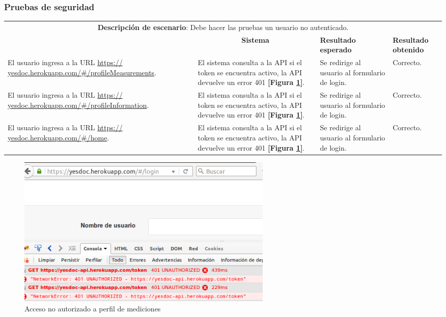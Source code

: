 \subsubsection{Pruebas de seguridad }
\begin{center}
	\begin{longtable}{|m{4cm}|m{4cm}|m{3cm}|m{2cm}|}
		\hline \hline \rowcolor[gray]{0.9}
		\multicolumn{4}{|c|}{\textbf{Procedimiento de pruebas}} \\
		\hline 
		
		\multicolumn{4}{|c|}{\textbf{Descripción de escenario}: Debe hacer las pruebas un usuario no autenticado.} \\
		\hline 
		
		\rowcolor[gray]{0.9}
		\multicolumn{1}{|c|}{\textbf{Actor}} &
		\multicolumn{1}{c|}{\textbf{Sistema}} &
		\textbf{Resultado esperado}&
		\textbf{Resultado obtenido} \\
		\hline
		El usuario ingresa a la URL \url{https:// yesdoc.herokuapp.com/#/profileMeasurements}.
		&
		El sistema consulta a la API si el token se encuentra activo, la API devuelve un error 401 \textbf{[Figura \ref{no_autorizado_profile_measurement}]}.
		&
		Se redirige al usuario al formulario de login.
		&
		Correcto.
		\\ 
		\hline
		El usuario ingresa a la URL \url{https:// yesdoc.herokuapp.com/#/profileInformation}.
		&
		El sistema consulta a la API si el token se encuentra activo, la API devuelve un error 401 \textbf{[Figura \ref{no_autorizado_profile_measurement}]}.
		&
		Se redirige al usuario al formulario de login.
		&
		Correcto.
		\\ 
		\hline
		El usuario ingresa a la URL \url{https:// yesdoc.herokuapp.com/#/home}.
		&
		El sistema consulta a la API si el token se encuentra activo, la API devuelve un error 401 \textbf{[Figura \ref{no_autorizado_profile_measurement}]}.
		&
		Se redirige al usuario al formulario de login.
		&
		Correcto.
		\\ 
		\hline
				
	\end{longtable}
\end{center}

 \begin{figure}[h]
 	\centering
 	\includegraphics[width=0.6\textwidth]{img/no_autorizado_profile_measurement}
 	\caption{Acceso no autorizado a perfil de mediciones}
 	\label{no_autorizado_profile_measurement}
 \end{figure}
 
